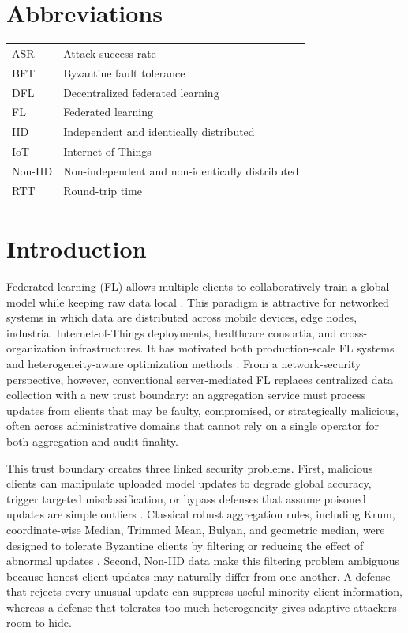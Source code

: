\documentclass[preprint,12pt]{elsarticle}
\begin{document}
\section*{Abbreviations}

\begin{tabular}{ll}
ASR & Attack success rate \\
BFT & Byzantine fault tolerance \\
DFL & Decentralized federated learning \\
FL & Federated learning \\
IID & Independent and identically distributed \\
IoT & Internet of Things \\
Non-IID & Non-independent and non-identically distributed \\
RTT & Round-trip time \\
\end{tabular}

\section{Introduction}

Federated learning (FL) allows multiple clients to collaboratively train a global model while keeping raw data local \citep{mcmahan2017fedavg,kairouz2021advances}. This paradigm is attractive for networked systems in which data are distributed across mobile devices, edge nodes, industrial Internet-of-Things deployments, healthcare consortia, and cross-organization infrastructures. It has motivated both production-scale FL systems and heterogeneity-aware optimization methods \citep{bonawitz2019scale,li2020fedprox,karimireddy2020scaffold,reddi2021fedopt}. From a network-security perspective, however, conventional server-mediated FL replaces centralized data collection with a new trust boundary: an aggregation service must process updates from clients that may be faulty, compromised, or strategically malicious, often across administrative domains that cannot rely on a single operator for both aggregation and audit finality.

This trust boundary creates three linked security problems. First, malicious clients can manipulate uploaded model updates to degrade global accuracy, trigger targeted misclassification, or bypass defenses that assume poisoned updates are simple outliers \citep{fang2020local,bagdasaryan2020backdoor,baruch2019little,cao2021fltrust}. Classical robust aggregation rules, including Krum, coordinate-wise Median, Trimmed Mean, Bulyan, and geometric median, were designed to tolerate Byzantine clients by filtering or reducing the effect of abnormal updates \citep{blanchard2017krum,yin2018byzantine,elmhamdi2018bulyan,pillutla2022rfa}. Second, Non-IID data make this filtering problem ambiguous because honest client updates may naturally differ from one another. A defense that rejects every unusual update can suppress useful minority-client information, whereas a defense that tolerates too much heterogeneity gives adaptive attackers room to hide.
\end{document}
